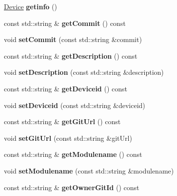 \begin{DoxyCompactItemize}
\hyperlink{classDevice}{Device} {\bfseries getinfo} ()
\item 
\mbox{\label{classDevice_ae5b04fdd1bf82d2dba2ec249e92e4da5}} 
const std\+::string \& {\bfseries get\+Commit} () const
\item 
\mbox{\label{classDevice_a2d549bad1c70b5768698dbc2175669ef}} 
void {\bfseries set\+Commit} (const std\+::string \&commit)
\item 
\mbox{\label{classDevice_a6ba1792dd4f33f99e7b3ff97c4fae153}} 
const std\+::string \& {\bfseries get\+Description} () const
\item 
\mbox{\label{classDevice_a3f71228960ac3bfca0a1cca254ea782b}} 
void {\bfseries set\+Description} (const std\+::string \&description)
\item 
\mbox{\label{classDevice_ace938c6c2efffdcc2d17d49440cb55b7}} 
const std\+::string \& {\bfseries get\+Deviceid} () const
\item 
\mbox{\label{classDevice_a8bd16b3e099e864db3c09ba4f6225fb0}} 
void {\bfseries set\+Deviceid} (const std\+::string \&deviceid)
\item 
\mbox{\label{classDevice_a96f94097331f294afc73c6358918d408}} 
const std\+::string \& {\bfseries get\+Git\+Url} () const
\item 
\mbox{\label{classDevice_ae8587aa062a7a2f2b5b77e9a15569e53}} 
void {\bfseries set\+Git\+Url} (const std\+::string \&git\+Url)
\item 
\mbox{\label{classDevice_a77eeec87fea2ffc4d4140b315613bb1b}} 
const std\+::string \& {\bfseries get\+Modulename} () const
\item 
\mbox{\label{classDevice_a09e9d9bbcfa76268b7ebc30afa680c69}} 
void {\bfseries set\+Modulename} (const std\+::string \&modulename)
\item 
\mbox{\label{classDevice_a2b4556e5a3b1f955c3e498e1de75051c}} 
const std\+::string \& {\bfseries get\+Owner\+Git\+Id} () const
\item 

\end{DoxyCompactItemize}

